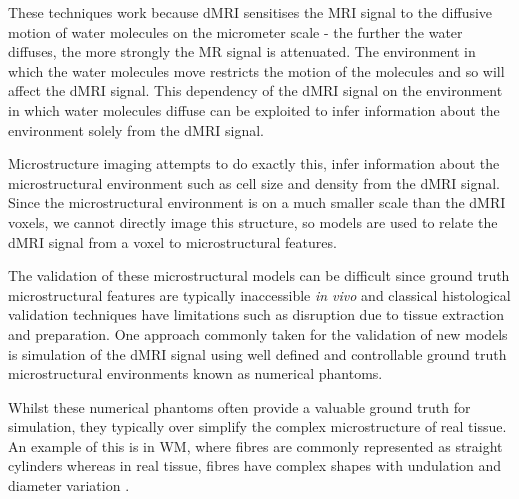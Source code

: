 These techniques work because \ac{dMRI} sensitises the \ac{MRI} signal to the diffusive motion of water molecules on the micrometer scale - the further the water diffuses, the more strongly the MR signal is attenuated.
The environment in which the water molecules move restricts the motion of the molecules and so will affect the \ac{dMRI} signal.
This dependency of the \ac{dMRI} signal on the environment in which water molecules diffuse can be exploited to infer information about the environment solely from the \ac{dMRI} signal.  


Microstructure imaging attempts to do exactly this, infer information about the microstructural environment such as cell size and density from the \ac{dMRI} signal.
Since the microstructural environment is on a much smaller scale than the \ac{dMRI} voxels, we cannot directly image this structure, so models are used to relate the \ac{dMRI} signal from a voxel to microstructural features.

The validation of these microstructural models can be difficult since ground truth microstructural features are typically inaccessible \emph{in vivo} and classical histological validation techniques have limitations such as disruption due to tissue extraction and preparation.
One approach commonly taken for the validation of new models is simulation of the \ac{dMRI} signal using well defined and controllable ground truth microstructural environments known as numerical phantoms. 

Whilst these numerical phantoms often provide a valuable ground truth for simulation, they typically over simplify the complex microstructure of real tissue.
An example of this is in \ac{WM}, where fibres are commonly represented as straight cylinders \cite{Hall2009,Leemans2005} whereas in real tissue, fibres have complex shapes with undulation and diameter variation \cite{Abdollahzadeh2019, Lee2019b}.

